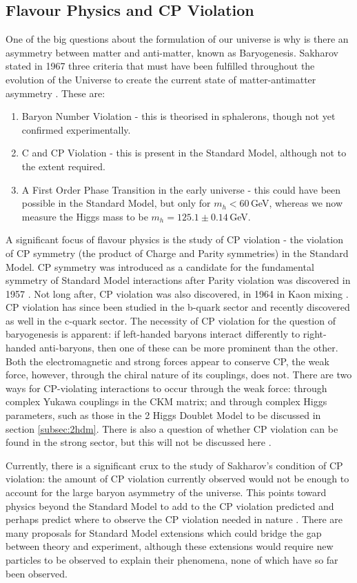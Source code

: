 \documentclass[a4paper,12pt]{article}
\begin{document}
\subsection{Flavour Physics and CP Violation}
\label{subsec:flavobs}
One of the big questions about the formulation of our universe is why is there an asymmetry between matter and anti-matter, known as Baryogenesis. 
Sakharov stated in 1967 three criteria that must have been fulfilled throughout the evolution of the Universe to create the current state of matter-antimatter asymmetry \cite{h}. 
These are:
\begin{enumerate}
    \item Baryon Number Violation - this is theorised in sphalerons, though not yet confirmed experimentally. 
    \item C and CP Violation - this is present in the Standard Model, although not to the extent required. 
    \item A First Order Phase Transition in the early universe - this could have been possible in the Standard Model, but only for $m_h<60\,$GeV, whereas we now measure the Higgs mass to be $m_h=125.1\pm0.14\,$GeV.
\end{enumerate}
A significant focus of flavour physics is the study of CP violation - the violation of CP symmetry (the product of Charge and Parity symmetries) in the Standard Model.
CP symmetry was introduced as a candidate for the fundamental symmetry of Standard Model interactions after Parity violation was discovered in 1957 \cite{wu}.
Not long after, CP violation was also discovered, in 1964 in Kaon mixing \cite{cpv}.
CP violation has since been studied in the b-quark sector and recently discovered as well in the c-quark sector. 
The necessity of CP violation for the question of baryogenesis is apparent: if left-handed baryons interact differently to right-handed anti-baryons, then one of these can be more prominent than the other. 
Both the electromagnetic and strong forces appear to conserve CP, the weak force, however, through the chiral nature of its couplings, does not.
There are two ways for CP-violating interactions to occur through the weak force: through complex Yukawa couplings in the CKM matrix; and through complex Higgs parameters, such as those in the 2 Higgs Doublet Model to be discussed in section \ref{subsec:2hdm}.
There is also a question of whether CP violation can be found in the strong sector, but this will not be discussed here \cite{m}.

Currently, there is a significant crux to the study of Sakharov's condition of CP violation: the amount of CP violation currently observed would not be enough to account for the large baryon asymmetry of the universe. 
This points toward physics beyond the Standard Model to add to the CP violation predicted and perhaps predict where to observe the CP violation needed in nature \cite{l}. 
There are many proposals for Standard Model extensions which could bridge the gap between theory and experiment, although these extensions would require new particles to be observed to explain their phenomena, none of which have so far been observed. 
\end{document}
